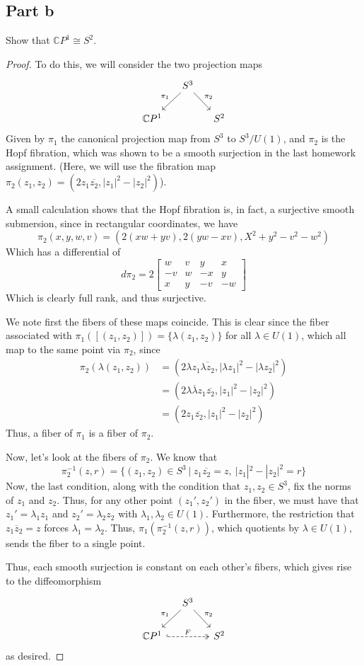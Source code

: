 \documentclass[fontsize=11pt]{scrartcl} %
\numberwithin{equation}{section} %
\numberwithin{figure}{section} %
\numberwithin{table}{section} %
\newcommand{\C}{\mathbb{C}}
\begin{document}
\subsection*{Part b}
Show that $\C P^1 \cong S^2$.
\\
\begin{proof}
To do this, we will consider the two projection maps
\[
\begin{tikzcd}[column sep=small]
 &S^3 \arrow[swap]{dl}{\pi_1} \arrow{dr}{\pi_2}& \\
\C P^1 & & S^2
\end{tikzcd}
\]
Given by $\pi_1$ the canonical projection map from $S^3$ to $S^3/{U(1)}$,
and $\pi_2$ is the Hopf fibration, which was shown to be a smooth surjection in the last
homework assignment. (Here, we will use the fibration map $\pi_2(z_1,z_2) = (2z_1\overline{z_2},|z_1|^2-|z_2|^2)$).

A small calculation shows that the Hopf fibration is, in fact, a surjective smooth
submersion, since in rectangular coordinates, we have
\[
\pi_2(x,y,w,v) = (2(xw+yv),2(yw-xv),X^2+y^2-v^2-w^2)
\]
Which has a differential of
\[
d\pi_2 = 2
\begin{bmatrix}
w & v & y & x\\
-v &w &-x & y\\
x & y &-v &-w
\end{bmatrix}
\]
Which is clearly full rank, and thus surjective.

We note first the fibers of these maps coincide. This is clear since the fiber associated
with $\pi_1([(z_1,z_2)]) = \{\lambda (z_1,z_2)\}$ for all $\lambda\in U(1)$, which all map to the same
point via $\pi_2$, since 
\[
\begin{aligned}
\pi_2(\lambda(z_1,z_2)) &= (2\lambda z_1\overline{\lambda z_2},|\lambda z_1|^2-|\lambda z_2|^2)\\
                        &= (2\lambda\overline{\lambda}z_1\overline{z_2}, |z_1|^2 - |z_2|^2)\\
                        &= (2z_1\overline{z_2},|z_1|^2-|z_2|^2)
\end{aligned}
\]
Thus, a fiber of $\pi_1$ is a fiber of $\pi_2$.

Now, let's look at the fibers of $\pi_2$. We know that
\[
\pi_2^{-1}(z,r) = \{(z_1,z_2)\in S^3\ |\ z_1\overline{z_2} = z,\ |z_1|^2-|z_2|^2 = r\}
\]
Now, the last condition, along with the condition that $z_1,z_2\in S^3$, fix the norms of
$z_1$ and $z_2$. Thus, for any other point $(z_1',z_2')$ in the fiber, we must have
that $z_1' = \lambda_1 z_1$ and $z_2' = \lambda_2 z_2$ with $\lambda_1,\lambda_2\in U(1)$.
Furthermore, the restriction
that $z_1\overline z_2 = z$ forces $\lambda_1 = \lambda_2$. Thus,
$\pi_1(\pi_2^{-1}(z,r))$, which quotients by $\lambda \in U(1)$, sends the fiber 
to a single point.

Thus, each smooth surjection is constant on each other's fibers, which gives rise to the
diffeomorphism
\[
\begin{tikzcd}[column sep=small]
 &S^3 \arrow[swap]{dl}{\pi_1} \arrow{dr}{\pi_2}& \\
\C P^1 \arrow[dashed, hook, two heads]{rr}{F}& & S^2
\end{tikzcd}
\]
as desired.
\end{proof}
\end{document}
